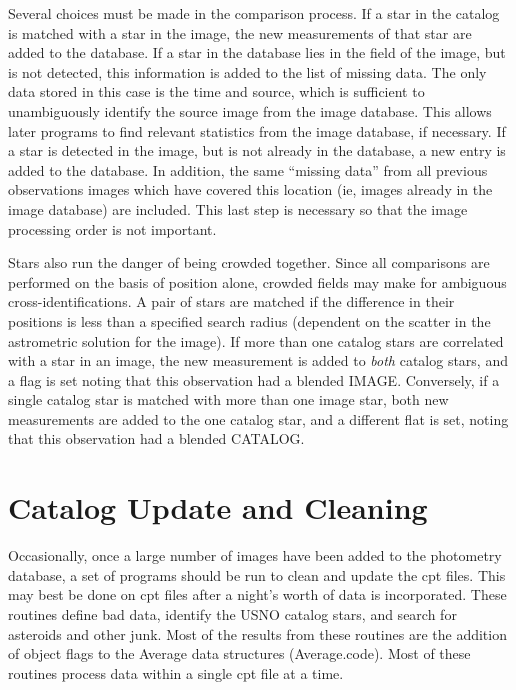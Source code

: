 \documentclass{article}
\newcommand\ty{\sc}                   %
\begin{document}
Several choices must be made in the comparison process.  If a star in
the catalog is matched with a star in the image, the new measurements
of that star are added to the database.  If a star in the database
lies in the field of the image, but is not detected, this information
is added to the list of missing data.  The only data stored in this
case is the time and source, which is sufficient to unambiguously
identify the source image from the image database.  This allows later
programs to find relevant statistics from the image database, if
necessary.  If a star is detected in the image, but is not already in
the database, a new entry is added to the database.  In addition, the
same ``missing data'' from all previous observations images which have
covered this location (ie, images already in the image database) are
included.  This last step is necessary so that the image processing
order is not important.  

Stars also run the danger of being crowded together.  Since all
comparisons are performed on the basis of position alone, crowded
fields may make for ambiguous cross-identifications.  A pair of stars
are matched if the difference in their positions is less than a
specified search radius (dependent on the scatter in the astrometric
solution for the image).  If more than one catalog stars are correlated
with a star in an image, the new measurement is added to {\em both}
catalog stars, and a flag is set noting that this observation had a
blended IMAGE.  Conversely, if a single catalog star is matched with
more than one image star, both new measurements are added to the one
catalog star, and a different flat is set, noting that this
observation had a blended CATALOG.

\section{Catalog Update and Cleaning}

Occasionally, once a large number of images have been added to the
photometry database, a set of programs should be run to clean and
update the {\ty cpt} files.  This may best be done on {\ty cpt} files after a
night's worth of data is incorporated.  These routines define bad
data, identify the USNO catalog stars, and search for asteroids and
other junk.  Most of the results from these routines are the addition
of object flags to the Average data structures (Average.code).  Most
of these routines process data within a single {\ty cpt} file at a time.
\end{document}
